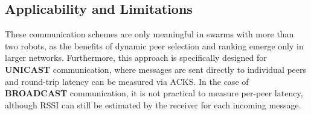 \documentclass[conference]{IEEEtran}
\begin{document}
\subsection{Applicability and Limitations}

These communication schemes are only meaningful in swarms with more than two robots, as the benefits of dynamic peer selection and ranking emerge only in larger networks. Furthermore, this approach is specifically designed for \textbf{UNICAST} communication, where messages are sent directly to individual peers and round-trip latency can be measured via ACKS. In the case of \textbf{BROADCAST} communication, it is not practical to measure per-peer latency, although RSSI can still be estimated by the receiver for each incoming message.






\newpage
\printbibliography
\end{document}
